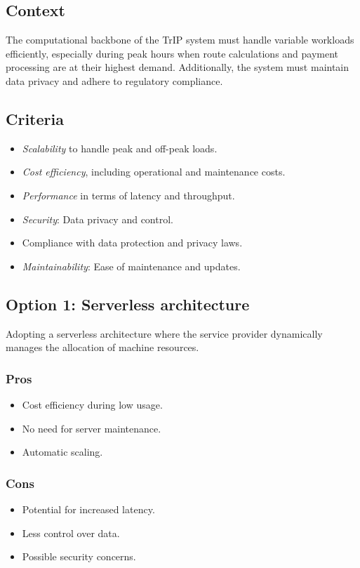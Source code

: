 \subsection*{Context}
The computational backbone of the TrIP system must handle variable workloads efficiently, especially during peak hours when route calculations and payment processing are at their highest demand. Additionally, the system must maintain data privacy and adhere to regulatory compliance.

\subsection*{Criteria}
\begin{itemize}[noitemsep]
    \item \textit{Scalability} to handle peak and off-peak loads.
    \item \textit{Cost efficiency}, including operational and maintenance costs.
    \item \textit{Performance} in terms of latency and throughput.
    \item \textit{Security}: Data privacy and control.
    \item Compliance with data protection and privacy laws.
    \item \textit{Maintainability}: Ease of maintenance and updates.
\end{itemize}

\subsection*{Option 1: Serverless architecture}
Adopting a serverless architecture where the service provider dynamically manages the allocation of machine resources.
\subsubsection*{Pros}
\begin{itemize}
    \item Cost efficiency during low usage.
    \item No need for server maintenance.
    \item Automatic scaling.
\end{itemize}
\subsubsection*{Cons}
\begin{itemize}
    \item Potential for increased latency.
    \item Less control over data.
    \item Possible security concerns.
\end{itemize}


